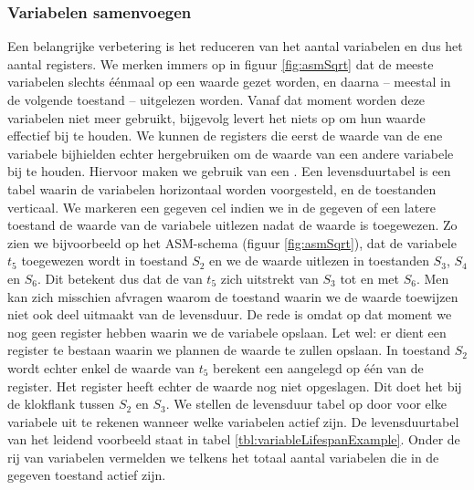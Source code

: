 \subsubsection{Variabelen samenvoegen}
Een belangrijke verbetering is het reduceren van het aantal variabelen en dus het aantal registers. We merken immers op in figuur \ref{fig:asmSqrt} dat de meeste variabelen slechts \'e\'enmaal op een waarde gezet worden, en daarna -- meestal in de volgende toestand -- uitgelezen worden. Vanaf dat moment worden deze variabelen niet meer gebruikt, bijgevolg levert het niets op om hun waarde effectief bij te houden. We kunnen de registers die eerst de waarde van de ene variabele bijhielden echter hergebruiken om de waarde van een andere variabele bij te houden. Hiervoor maken we gebruik van een . Een levensduurtabel is een tabel waarin de variabelen horizontaal worden voorgesteld, en de toestanden verticaal. We markeren een gegeven cel indien we in de gegeven of een latere toestand de waarde van de variabele uitlezen nadat de waarde is toegewezen. Zo zien we bijvoorbeeld op het ASM-schema (figuur \ref{fig:asmSqrt}), dat de variabele $t_5$ toegewezen wordt in toestand $S_2$ en we de
waarde uitlezen in toestanden $S_3$, $S_4$ en $S_6$. Dit betekent dus dat de  van $t_5$ zich uitstrekt van $S_3$ tot en met $S_6$. Men kan zich misschien afvragen waarom de toestand waarin we de waarde toewijzen niet ook deel uitmaakt van de levensduur. De rede is omdat op dat moment we nog geen register hebben waarin we de variabele opslaan. Let wel: er dient een register te bestaan waarin we plannen de waarde te zullen opslaan. In toestand $S_2$ wordt echter enkel de waarde van $t_5$ berekent een aangelegd op \'e\'en van de register. Het register heeft echter de waarde nog niet opgeslagen. Dit doet het bij de klokflank tussen $S_2$ en $S_3$. We stellen de levensduur tabel op door voor elke variabele uit te rekenen wanneer welke variabelen actief zijn. De levensduurtabel van het leidend voorbeeld staat in tabel \ref{tbl:variableLifespanExample}. Onder de rij van variabelen vermelden we telkens het totaal aantal variabelen die in de gegeven toestand actief zijn.
